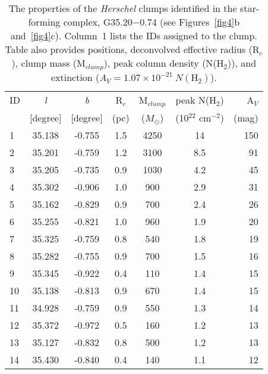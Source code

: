 \documentclass[iop]{emulateapj}
\begin{document}
\begin{table*}
\setlength{\tabcolsep}{0.05in}
\centering
\caption{The properties of the {\it Herschel} clumps identified in the star-forming complex, G35.20$-$0.74 
(see Figures~\ref{fig4}b and~\ref{fig4}c). Column~1 lists the IDs assigned to the clump. Table also provides 
positions, deconvolved effective radius (R$_{c}$), clump mass (M$_{clump}$), peak column density (N(H$_{2}$)), and extinction ($A_V=1.07 \times 10^{-21}~N(\mathrm H_2)$).}
\label{tab1}
\begin{tabular}{lcccccr}
\hline 
ID & {\it l}       & {\it b}     & R$_{c}$ & M$_{clump}$ & peak N(H$_{2}$) & A$_{V}$\\
    &  [degree] & [degree] &  (pc)      &($M_\odot$)   &(10$^{22}$ cm$^{-2}$) &(mag) \\
\hline
\hline
       1  &	 35.138     &	-0.755   &	 1.5	&    4250 & 14     &     150  \\
       2  &	 35.201     &	-0.759   &	 1.2	&    3100 & 8.5    &       91  \\
       3  &	 35.205     &	-0.735   &	 0.9	&    1030 & 4.2    &       45  \\
       4  &	 35.302     &	-0.906   &	 1.0	&     900 & 2.9    &       31  \\
       5  &	 35.162     &	-0.829   &	 0.9	&     700 & 2.4    &       26  \\
       6  &	 35.255     &	-0.821   &	 1.0	&     960 & 1.9    &       20  \\
       7  &	 35.325     &	-0.759   &	 0.8	&     540 & 1.8    &       19  \\
       8  &	 35.282     &	-0.755   &	 0.9	&     700 & 1.5    &       16  \\
       9  &	 35.345     &	-0.922   &	 0.4	&     110 & 1.4    &       15  \\
      10  &	 35.138     &	-0.813   &	 0.9	&     670 & 1.4    &       15  \\
      11  &	 34.928     &	-0.759   &	 0.9	&     550 & 1.3    &       14  \\
      12  &	 35.372     &	-0.972   &	 0.5	&     160 & 1.2    &       13  \\
      13  &	 35.127     &	-0.832   &	 0.8	&     500 & 1.2    &       13  \\
      14  &	 35.430     &	-0.840   &	 0.4	&     140 & 1.1    &       12  \\
\hline          
\end{tabular}
\end{table*}
     
      
      
\end{document}
